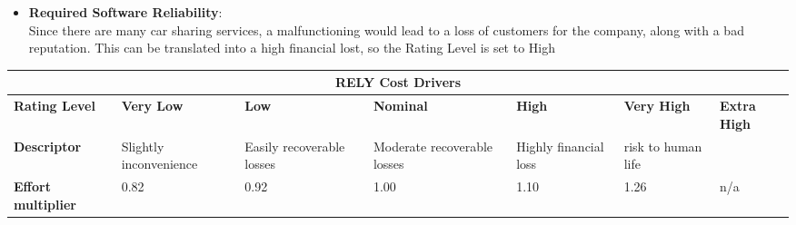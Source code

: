 \begin{itemize}
\item \textbf{Required Software Reliability}:\\
Since there are many car sharing services, a malfunctioning would lead to a loss of customers for the company, along with a bad reputation. This can be translated into a high financial lost, so the Rating Level is set to High
\end{itemize}
\hspace*{-3cm}\begin{tabular}{|p{3cm}|p{2cm}|p{2cm}|p{2cm}|p{2cm}|p{2cm}|p{2cm}|}
\hline
\multicolumn{7}{|c|}{\textbf{RELY Cost Drivers}}\\
\hline
\hline
\textbf{Rating Level} & \textbf{Very Low} & \textbf{Low} & \textbf{Nominal} & \textbf{High} & \textbf{Very High} & \textbf{Extra High}\\
\hline
\textbf{Descriptor} & Slightly inconvenience & Easily recoverable losses & Moderate recoverable losses & Highly financial loss & risk to human life & \\
\hline
\textbf{Effort multiplier} & 0.82 & 0.92 & 1.00 & 1.10 & 1.26 & n/a\\
\hline 
\end{tabular}